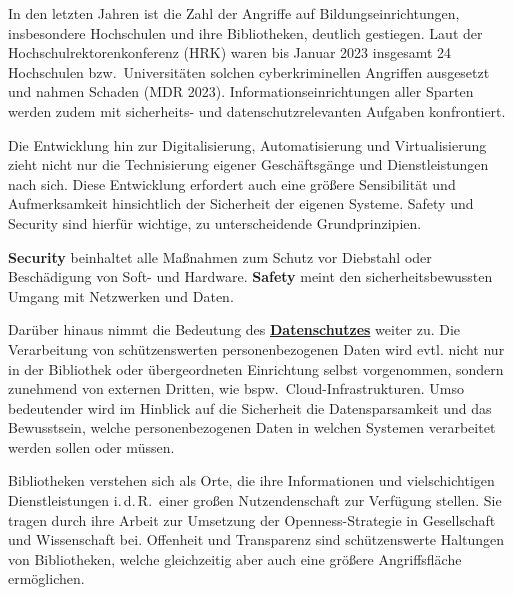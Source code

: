 \documentclass[
  11pt,
  letterpaper,
  DIV=11,
  twoside]{scrreprt}
\begin{document}
In den letzten Jahren ist die Zahl der Angriffe auf
Bildungseinrichtungen, insbesondere Hochschulen und ihre Bibliotheken,
deutlich gestiegen. Laut der Hochschulrektorenkonferenz (HRK) waren bis
Januar 2023 insgesamt 24 Hochschulen bzw.~Universitäten solchen
cyberkriminellen Angriffen ausgesetzt und nahmen Schaden (MDR 2023).
Informationseinrichtungen aller Sparten werden zudem mit sicherheits-
und datenschutzrelevanten Aufgaben konfrontiert.

Die Entwicklung hin zur Digitalisierung, Automatisierung und
Virtualisierung zieht nicht nur die Technisierung eigener Geschäftsgänge
und Dienstleistungen nach sich. Diese Entwicklung erfordert auch eine
größere Sensibilität und Aufmerksamkeit hinsichtlich der Sicherheit der
eigenen Systeme. Safety und Security sind hierfür wichtige, zu
unterscheidende Grundprinzipien.

\begin{tcolorbox}[enhanced jigsaw, leftrule=.75mm, toprule=.15mm, left=2mm, opacityback=0, arc=.35mm, colback=white, breakable, colframe=quarto-callout-important-color-frame, rightrule=.15mm, bottomrule=.15mm]
\begin{minipage}[t]{5.5mm}
\textcolor{quarto-callout-important-color}{\faExclamation}
\end{minipage}%
\begin{minipage}[t]{\textwidth - 5.5mm}

\textbf{Security} beinhaltet alle Maßnahmen zum Schutz vor Diebstahl
oder Beschädigung von Soft- und Hardware. \textbf{Safety} meint den
sicherheitsbewussten Umgang mit Netzwerken und Daten.

\end{minipage}%
\end{tcolorbox}

Darüber hinaus nimmt die Bedeutung des
\hyperref[datenschutz]{\textbf{Datenschutzes}} weiter zu. Die
Verarbeitung von schützenswerten personenbezogenen Daten wird evtl.
nicht nur in der Bibliothek oder übergeordneten Einrichtung selbst
vorgenommen, sondern zunehmend von externen Dritten, wie
bspw.~Cloud-Infrastrukturen. Umso bedeutender wird im Hinblick auf die
Sicherheit die Datensparsamkeit und das Bewusstsein, welche
personenbezogenen Daten in welchen Systemen verarbeitet werden sollen
oder müssen.

Bibliotheken verstehen sich als Orte, die ihre Informationen und
vielschichtigen Dienstleistungen i.\,d.\,R.~einer großen Nutzendenschaft
zur Verfügung stellen. Sie tragen durch ihre Arbeit zur Umsetzung der
Openness-Strategie in Gesellschaft und Wissenschaft bei. Offenheit und
Transparenz sind schützenswerte Haltungen von Bibliotheken, welche
gleichzeitig aber auch eine größere Angriffsfläche ermöglichen.
\end{document}
